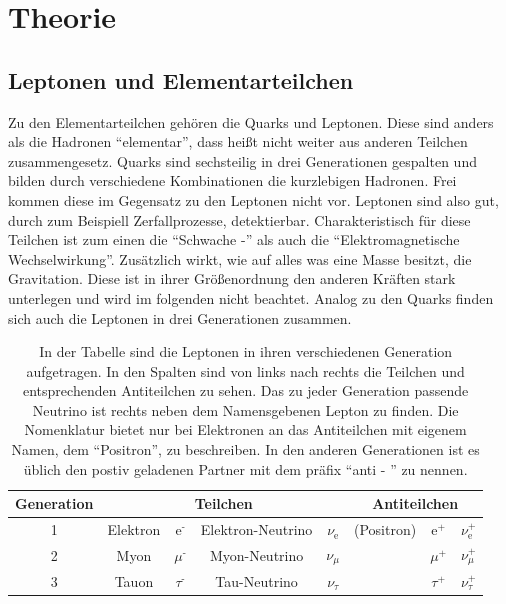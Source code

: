 \section{Theorie}
\subsection{Leptonen und Elementarteilchen}
Zu den Elementarteilchen gehören die Quarks und Leptonen. Diese sind anders als die Hadronen \enquote{elementar}, dass heißt nicht weiter aus anderen Teilchen zusammengesetz. 
Quarks sind sechsteilig in drei Generationen gespalten und bilden durch verschiedene Kombinationen die kurzlebigen Hadronen. Frei kommen diese im Gegensatz zu den Leptonen nicht vor. 
Leptonen sind also gut, durch zum Beispiell Zerfallprozesse, detektierbar. Charakteristisch für diese Teilchen ist zum einen die \enquote{Schwache -} als auch die 
\enquote{Elektromagnetische Wechselwirkung}. Zusätzlich wirkt, wie auf alles was eine Masse besitzt, die Gravitation. Diese ist in ihrer Größenordnung den anderen Kräften stark unterlegen und wird im folgenden
nicht beachtet. Analog zu den Quarks finden sich auch die Leptonen in drei Generationen zusammen. 
\begin{table}
    \centering
    \caption{In der Tabelle sind die Leptonen in ihren verschiedenen Generation aufgetragen. In den Spalten sind von links nach rechts die Teilchen und entsprechenden Antiteilchen zu sehen.
            Das zu jeder Generation passende Neutrino ist rechts neben dem Namensgebenen Lepton zu finden. Die Nomenklatur bietet nur bei Elektronen an das Antiteilchen mit eigenem Namen, dem \enquote{Positron}, zu beschreiben. In den 
            anderen Generationen ist es üblich den postiv geladenen Partner mit dem präfix \enquote{anti - } zu nennen.}
    \label{tab:1}
    \begin{tabular}{c | c c c c | c c c}
        \toprule
        Generation &\multicolumn{4}{c}{Teilchen} & \multicolumn{3}{c}{Antiteilchen}  \\
        \midrule
        1      &       Elektron & $\text{e}^\text{-}$   &     Elektron-Neutrino  &  $\nu_\text{e}$  &    (Positron) & $\text{e}^\text{+}$  &   $\nu_\text{e}^\text{+}$  \\
        2      &      Myon & $\mu^\text{-}$         &           Myon-Neutrino       &  $\nu_\mu$       &            & $\mu^\text{+}$       &   $\nu_\mu^\text{+}$        \\
        3      &      Tauon & $\tau^\text{-}$         &       Tau-Neutrino         &  $\nu_\tau$      &            & $\tau^\text{+}$      &   $\nu_\tau^\text{+}$       \\
    \end{tabular}
\end{table}
